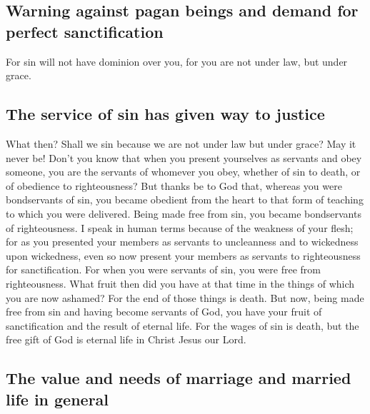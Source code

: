 \hypertarget{warning-against-pagan-beings-and-demand-for-perfect-sanctification}{%
\subsection{Warning against pagan beings and demand for perfect
sanctification}\label{warning-against-pagan-beings-and-demand-for-perfect-sanctification}}

 For sin will not have dominion over you, for you are not
under law, but under grace.

\hypertarget{the-service-of-sin-has-given-way-to-justice}{%
\subsection{The service of sin has given way to
justice}\label{the-service-of-sin-has-given-way-to-justice}}

 What then? Shall we sin because we are not under law but
under grace? May it never be!  Don't you know that when
you present yourselves as servants and obey someone, you are the
servants of whomever you obey, whether of sin to death, or of obedience
to righteousness?  But thanks be to God that, whereas you
were bondservants of sin, you became obedient from the heart to that
form of teaching to which you were delivered.  Being made
free from sin, you became bondservants of righteousness. 
I speak in human terms because of the weakness of your flesh; for as you
presented your members as servants to uncleanness and to wickedness upon
wickedness, even so now present your members as servants to
righteousness for sanctification.  For when you were
servants of sin, you were free from righteousness.  What
fruit then did you have at that time in the things of which you are now
ashamed? For the end of those things is death.  But now,
being made free from sin and having become servants of God, you have
your fruit of sanctification and the result of eternal life.
 For the wages of sin is death, but the free gift of God
is eternal life in Christ Jesus our Lord.

\hypertarget{the-value-and-needs-of-marriage-and-married-life-in-general}{%
\subsection{The value and needs of marriage and married life in
general}\label{the-value-and-needs-of-marriage-and-married-life-in-general}}

